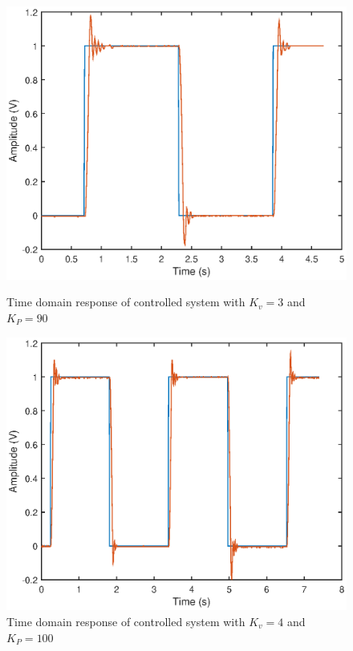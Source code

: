 \documentclass{article}
\begin{document}
\begin{figure}[H]
	\hspace{0.5cm}
	\begin{minipage}{7cm}
		\centering
		\includegraphics[scale=0.5]{fig23}
		\caption{Time domain response of controlled system with $K_v = 3$ and $K_P = 90$}
	\end{minipage}
	\hspace{1cm}
	\begin{minipage}{7cm}
		\centering
		\includegraphics[scale=0.5]{fig24}
		\caption{Time domain response of controlled system with $K_v = 4$ and $K_P = 100$}
	\end{minipage}
\end{figure}
\end{document}
